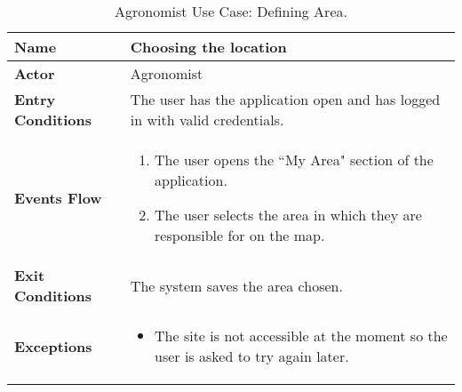 
\begin{table}[hbt!]
\centering
\small
\caption{\label{tab:agrLocation}Agronomist Use Case: Defining Area.}

\renewcommand{\arraystretch}{1.25}
\begin{tabular}{|l|>{\raggedright\arraybackslash}m{12cm}|}

    \hline
    \textbf{Name} & Choosing the location\\
    \hline
   	\textbf{Actor} & Agronomist\\
    \hline
    \textbf{Entry Conditions} & The user has the application open and has logged in with valid credentials.\\
    \hline
    \textbf{Events Flow} & \begin{enumerate}
            \item The user opens the “My Area" section of the application.
            \item The user selects the area in which they are responsible for on the map.
       \end{enumerate}\\
    \hline
    \textbf{Exit Conditions} & The system saves the area chosen.\\
    \hline
    \textbf{Exceptions} & 
        \begin{itemize}
          \item The site is not accessible at the moment so the user is asked to try again later.
        \end{itemize}
     \\
    \hline
\end{tabular}
\end{table}